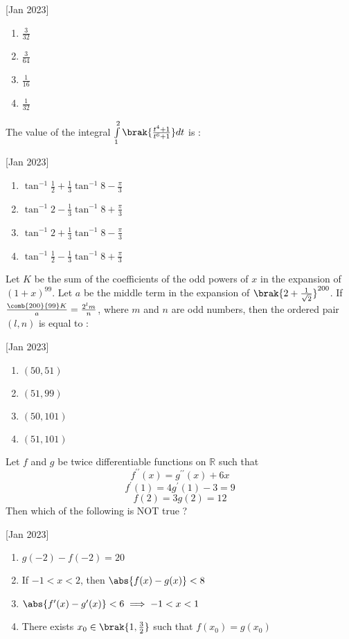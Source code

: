     \hfill[Jan 2023]
        \begin{enumerate}
            \item $\frac{3}{32}$
            \item $\frac{3}{64}$
            \item $\frac{1}{16}$
            \item $\frac{1}{32}$
        \end{enumerate}

    \item The value of the integral $\int\limits_1^2\brak{\frac{t^4+1}{t^6+1}}dt$ is :
    
    \hfill[Jan 2023]
        \begin{enumerate}
            \item $\tan^{-1}\frac{1}{2}+\frac{1}{3}\tan^{-1}8-\frac{\pi}{3}$
            \item $\tan^{-1}2-\frac{1}{3}\tan^{-1}8+\frac{\pi}{3}$
            \item $\tan^{-1}2+\frac{1}{3}\tan^{-1}8-\frac{\pi}{3}$
            \item $\tan^{-1}\frac{1}{2}-\frac{1}{3}\tan^{-1}8+\frac{\pi}{3}$
        \end{enumerate}

    \item Let $K$ be the sum of the coefficients of the odd powers of $x$ in the expansion of $(1+x)^{99}$. Let $a$ be the middle term in the expansion of $\brak{2+\frac{1}{\sqrt{2}}}^{200}$. If $\frac{\comb{200}{99}K}{a}=\frac{2^lm}{n}$, where $m$ and $n$ are odd numbers, then the ordered pair $(l,n)$ is equal to :
    
    \hfill[Jan 2023]
        \begin{enumerate}
            \item $(50,51)$
            \item $(51,99)$
            \item $(50,101)$
            \item $(51,101)$
        \end{enumerate}

    \item Let $f$ and $g$ be twice differentiable functions on $\mathbb{R}$ such that
        $$f^{\prime\prime}(x)=g^{\prime\prime}(x)+6x$$
        $$f^\prime(1)=4g^\prime(1)-3=9$$
        $$f(2)=3g(2)=12$$
        Then which of the following is NOT true ?
    
    \hfill[Jan 2023]
        \begin{enumerate}
            \item $g(-2)-f(-2)=20$
            \item If $-1<x<2$, then $\abs{f(x)-g(x)}<8$
            \item $\abs{f^\prime(x)-g^\prime(x)}<6\implies-1<x<1$
            \item There exists $x_0\in\brak{1,\frac{3}{2}}$ such that $f(x_0)=g(x_0)$
        \end{enumerate}


